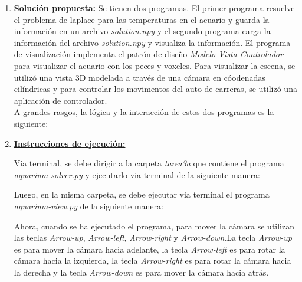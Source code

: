 \documentclass[letterpaper,11pt,oneside]{article}
\begin{document}
	





\begin{enumerate}
    \item \textbf{\underline{Solución propuesta:}} 
        Se tienen dos programas. El primer programa resuelve el problema de laplace para las temperaturas en el acuario y guarda la información en un archivo \textit{solution.npy} y el segundo programa carga la información del archivo \textit{solution.npy} y visualiza la información. El programa de visualización implementa el patrón de diseño \textit{Modelo-Vista-Controlador} para visualizar el acuario con los peces y voxeles. Para visualizar la escena, se utilizó una vista 3D modelada a través de una cámara en cóodenadas cilíndricas y para controlar los movimentos del auto de carreras, se utilizó una aplicación de controlador.\\

        A grandes rasgos, la lógica y la interacción de estos dos programas es la siguiente:


    \item \textbf{\underline{Instrucciones de ejecución:}} 

        Via terminal, se debe dirigir a la carpeta \textit{tarea3a} que contiene el programa \textit{aquarium-solver.py} y ejecutarlo via terminal de la siguiente manera:


        Luego, en la misma carpeta, se debe ejecutar via terminal el programa \textit{aquarium-view.py} de la siguiente manera:



        Ahora, cuando se ha ejecutado el programa, para mover la cámara se utilizan las teclas \textit{Arrow-up}, \textit{Arrow-left}, \textit{Arrow-right} y \textit{Arrow-down}.La tecla \textit{Arrow-up} es para mover la cámara hacia adelante, la tecla \textit{Arrow-left} es para rotar la cámara hacia la izquierda, la tecla \textit{Arrow-right} es para rotar la cámara hacia la derecha y la tecla \textit{Arrow-down} es para mover la cámara hacia atrás.\\


\end{enumerate}
\end{document}
